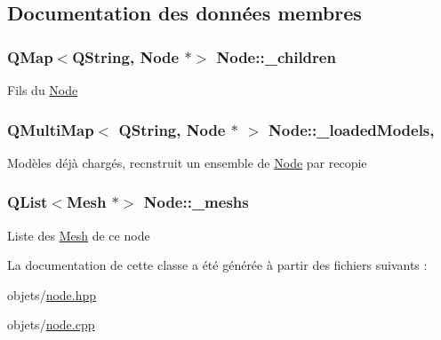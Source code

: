 \subsection{Documentation des données membres}
\hypertarget{class_node_aac0c3b4b1f41b26ec5a22d77f067ec5b}{
\subsubsection[{\+\_\+children}]{\setlength{\rightskip}{0pt plus 5cm}Q\+Map$<$Q\+String, {\bf Node} $\ast$$>$ Node\+::\+\_\+children\hspace{0.3cm}{\ttfamily [private]}}}\label{class_node_aac0c3b4b1f41b26ec5a22d77f067ec5b}
Fils du \hyperlink{class_node}{Node} \hypertarget{class_node_a2e510fe62f9ef864668e32ef9269543c}{
\subsubsection[{\+\_\+loaded\+Models}]{\setlength{\rightskip}{0pt plus 5cm}Q\+Multi\+Map$<$ Q\+String, {\bf Node} $\ast$ $>$ Node\+::\+\_\+loaded\+Models\hspace{0.3cm}{\ttfamily [static]}, {\ttfamily [private]}}}\label{class_node_a2e510fe62f9ef864668e32ef9269543c}
Modèles déjà chargés, recnstruit un ensemble de \hyperlink{class_node}{Node} par recopie \hypertarget{class_node_aad5e459a1ed03d6e09ad7054f2014f5a}{
\subsubsection[{\+\_\+meshs}]{\setlength{\rightskip}{0pt plus 5cm}Q\+List$<${\bf Mesh} $\ast$$>$ Node\+::\+\_\+meshs\hspace{0.3cm}{\ttfamily [private]}}}\label{class_node_aad5e459a1ed03d6e09ad7054f2014f5a}
Liste des \hyperlink{class_mesh}{Mesh} de ce node 

La documentation de cette classe a été générée à partir des fichiers suivants \+:\begin{DoxyCompactItemize}
\item 
objets/\hyperlink{node_8hpp}{node.\+hpp}\item 
objets/\hyperlink{node_8cpp}{node.\+cpp}\end{DoxyCompactItemize}
